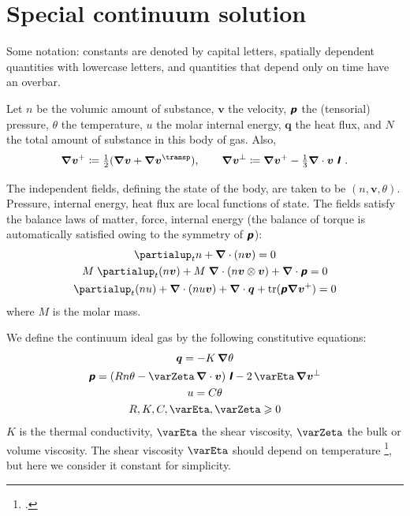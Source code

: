 \documentclass[\ifafour a4paper,12pt,\else a5paper,10pt,\fi%
onecolumn,oneside,article,%
british%
]{memoir}
\theoremstyle{remark}
\theoremstyle{innote}
\newcommand*{\mathte}[1]{\textbf{\textit{\textsf{#1}}}}
\newcommand*{\citep}{\footcites}
\newcommand*{\citey}{\footcites}%
\newcommand*{\amp}{\&}
\newcommand*{\de}{\partialup}%
\newcommand*{\nabl}{\bm{\nabla}}%
\DeclareMathOperator{\tr}{tr}%
\newcommand*{\defd}{\coloneqq}
\renewcommand*{\ge}{\geqslant}%
\renewcommand*{\|}[1][]{\nonscript\,#1\vert\nonscript\;\mathopen{}}
\newcommand*{\eg}{{e.g.}}
\newcommand*{\id}{\mathte{I}}%
\newcommand*{\T}{^\transp}%
\newcommand*{\yt}{\theta}
\newcommand*{\yq}{\bm{q}}
\newcommand*{\yv}{\bm{v}}
\newcommand*{\yp}{\mathte{p}}
\newcommand*{\yZ}{\varZeta}
\newcommand*{\yE}{\varEta}
\newcommand*{\yC}{C}
\begin{document}
\section{Special continuum solution}
\label{sec:cont_solution}

Some notation: constants are denoted by capital letters, spatially dependent
quantities with lowercase letters, and quantities that depend only on time
have an overbar.

Let $n$ be the volumic amount of substance, $\yv$ the velocity, $\yp$ the
(tensorial) pressure, $\yt$ the temperature, $u$ the molar internal energy,
$\yq$ the heat flux, and $N$ the total amount of substance in this body of
gas. Also,
\begin{equation}
  \label{eq:def_shear}
  \nabl\yv^{+}\defd \tfrac{1}{2}(\nabl\yv+\nabl\yv\T),
  \qquad
  \nabl\yv^{\perp}\defd \nabl\yv^{+}-\tfrac{1}{3}\nabl\cdot\yv\; \id \ .
\end{equation}

The independent fields, defining the state of the body, are taken to be
$(n, \yv,\yt)$. Pressure, internal energy, heat flux are local functions of
state. The fields satisfy the balance laws of matter, force, internal
energy (the balance of torque is automatically satisfied owing to the
symmetry of $\yp$):
\begin{gather}
  \label{eq:matter_bal}
  \de_{t}n +\nabl\cdot(n\yv) = 0
\\
  \label{eq:force_bal}
  M \; \de_{t}(n\yv) + M\; \nabl\cdot(n\yv\otimes\yv) + \nabl\cdot\yp = 0
\\
  \label{eq:energy_bal}
  \de_{t} (n u) + \nabl\cdot(n u \yv)  + \nabl\cdot\yq + \tr(\yp\nabl\yv^{+}) = 0
\end{gather}
where $M$ is the molar mass.

We define the continuum ideal gas by the following constitutive equations:
\begin{gather}
  \label{eq:const_idealgas}
  \yq = -K\,\nabl\yt %
  \\
  \yp = (R n \yt - \yZ\,\nabl\cdot\yv)\;\id - 2\,\yE\,\nabl\yv^{\perp}
  \\
  u = \yC\yt%
  \\
 R, K, C, \yE, \yZ \ge 0
\end{gather}
$K$ is the thermal conductivity, $\yE$ the shear viscosity, $\yZ$ the bulk
or volume viscosity. The shear viscosity $\yE$ should depend on temperature
\citep{sutherland1893}, but here we consider it constant for simplicity.
\end{document}
